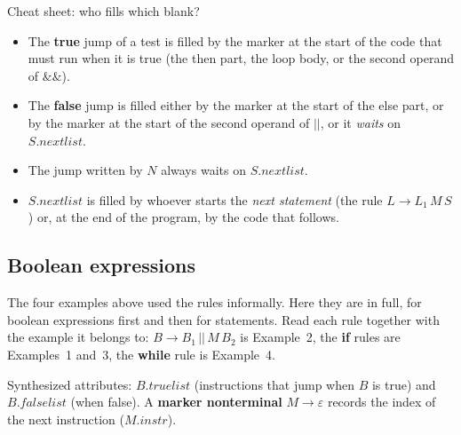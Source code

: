 \documentclass[11pt,a4paper]{article}
\newcommand{\at}[2]{\ensuremath{#1.\mathit{#2}}}
\begin{document}
\begin{notebox}{Cheat sheet: who fills which blank?}
\begin{itemize}[nosep]
\item The \textbf{true} jump of a test is filled by the marker at the start of the code that must run when it is true (the then part, the loop body, or the second operand of $\&\&$).
\item The \textbf{false} jump is filled either by the marker at the start of the else part, or by the marker at the start of the second operand of $||$, or it \emph{waits} on $S.nextlist$.
\item The jump written by $N$ always waits on $S.nextlist$.
\item $S.nextlist$ is filled by whoever starts the \emph{next statement} (the rule $L\to L_1\,M\,S$) or, at the end of the program, by the code that follows.
\end{itemize}
\end{notebox}


\subsection{Boolean expressions}
The four examples above used the rules informally. Here they are in full, for boolean expressions first and then for statements. Read each rule together with the example it belongs to: $B\to B_1\,||\,M\,B_2$ is Example~2, the \textbf{if} rules are Examples~1 and~3, the \textbf{while} rule is Example~4.

Synthesized attributes: \at{B}{truelist} (instructions that jump when $B$ is true) and \at{B}{falselist} (when false). A \textbf{marker nonterminal} $M \to \varepsilon$ records the index of the next instruction (\at{M}{instr}).
\end{document}
